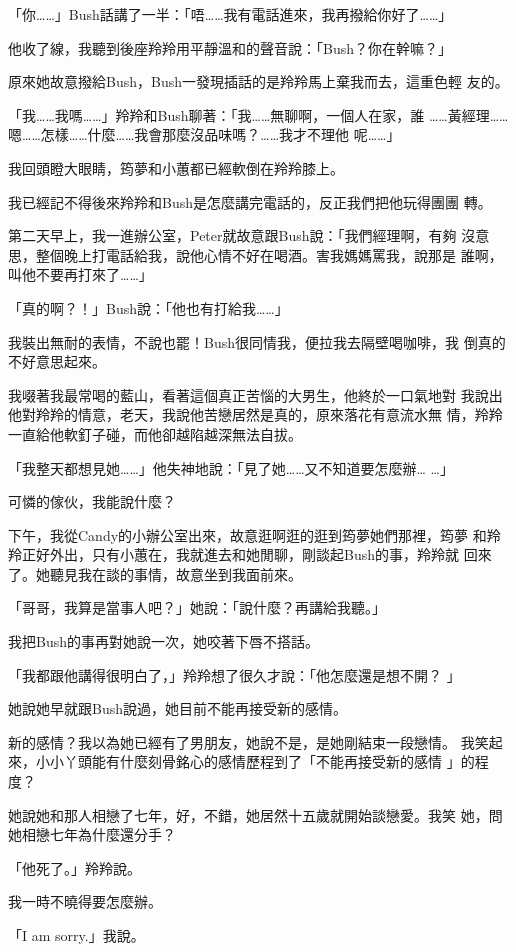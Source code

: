「你……」Bush話講了一半：「唔……我有電話進來，我再撥給你好了……」

他收了線，我聽到後座羚羚用平靜溫和的聲音說：「Bush？你在幹嘛？」

原來她故意撥給Bush，Bush一發現插話的是羚羚馬上棄我而去，這重色輕
友的。

「我……我嗎……」羚羚和Bush聊著：「我……無聊啊，一個人在家，誰
……黃經理……嗯……怎樣……什麼……我會那麼沒品味嗎？……我才不理他
呢……」

我回頭瞪大眼睛，筠夢和小蕙都已經軟倒在羚羚膝上。

我已經記不得後來羚羚和Bush是怎麼講完電話的，反正我們把他玩得團團
轉。

第二天早上，我一進辦公室，Peter就故意跟Bush說：「我們經理啊，有夠
沒意思，整個晚上打電話給我，說他心情不好在喝酒。害我媽媽罵我，說那是
誰啊，叫他不要再打來了……」

「真的啊？！」Bush說：「他也有打給我……」

我裝出無耐的表情，不說也罷！Bush很同情我，便拉我去隔壁喝咖啡，我
倒真的不好意思起來。

我啜著我最常喝的藍山，看著這個真正苦惱的大男生，他終於一口氣地對
我說出他對羚羚的情意，老天，我說他苦戀居然是真的，原來落花有意流水無
情，羚羚一直給他軟釘子碰，而他卻越陷越深無法自拔。

「我整天都想見她……」他失神地說：「見了她……又不知道要怎麼辦…
…」

可憐的傢伙，我能說什麼？

下午，我從Candy的小辦公室出來，故意逛啊逛的逛到筠夢她們那裡，筠夢
和羚羚正好外出，只有小蕙在，我就進去和她閒聊，剛談起Bush的事，羚羚就
回來了。她聽見我在談的事情，故意坐到我面前來。

「哥哥，我算是當事人吧？」她說：「說什麼？再講給我聽。」

我把Bush的事再對她說一次，她咬著下唇不搭話。

「我都跟他講得很明白了，」羚羚想了很久才說：「他怎麼還是想不開？
」

她說她早就跟Bush說過，她目前不能再接受新的感情。

新的感情？我以為她已經有了男朋友，她說不是，是她剛結束一段戀情。
我笑起來，小小丫頭能有什麼刻骨銘心的感情歷程到了「不能再接受新的感情
」的程度？

她說她和那人相戀了七年，好，不錯，她居然十五歲就開始談戀愛。我笑
她，問她相戀七年為什麼還分手？

「他死了。」羚羚說。

我一時不曉得要怎麼辦。

「I am sorry.」我說。

